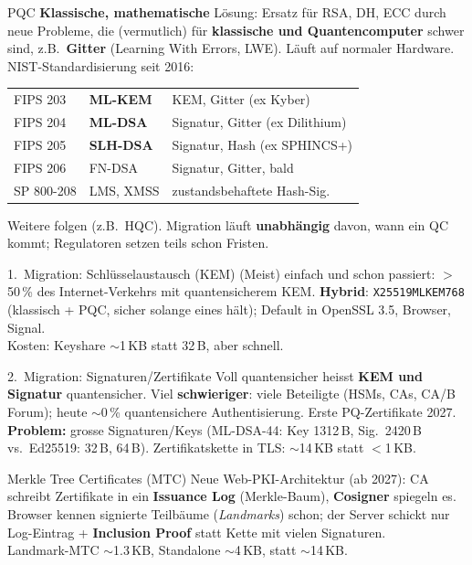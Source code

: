 \documentclass[a4paper, fontsize=7pt]{scrartcl}
\renewcommand*{\arraystretch}{1.5}  %
\begin{document}
\begin{mainbox}{PQC}
\textbf{Klassische, mathematische} Lösung: Ersatz für RSA, DH, ECC durch neue
Probleme, die (vermutlich) für \textbf{klassische und Quantencomputer} schwer sind,
z.B.\ \textbf{Gitter} (Learning With Errors, LWE). Läuft auf normaler Hardware.\\
NIST-Standardisierung seit 2016:
\renewcommand*{\arraystretch}{1.1}
\setlength{\tabcolsep}{3pt}
\begin{tabularx}{\linewidth}{@{}l|l|>{\raggedright\arraybackslash}X@{}}
FIPS 203 & \textbf{ML-KEM} & KEM, Gitter (ex Kyber) \\
FIPS 204 & \textbf{ML-DSA} & Signatur, Gitter (ex Dilithium) \\
FIPS 205 & \textbf{SLH-DSA} & Signatur, Hash (ex SPHINCS+) \\
FIPS 206 & FN-DSA & Signatur, Gitter, bald \\
SP 800-208 & LMS, XMSS & zustandsbehaftete Hash-Sig. \\
\end{tabularx}
Weitere folgen (z.B.\ HQC). Migration läuft \textbf{unabhängig} davon, wann ein QC
kommt; Regulatoren setzen teils schon Fristen.
\end{mainbox}

\begin{mainbox}{1.\ Migration: Schlüsselaustausch (KEM)}
(Meist) einfach und schon passiert: $>$50\,\% des Internet-Verkehrs mit
quantensicherem KEM. \textbf{Hybrid}: \texttt{X25519MLKEM768} (klassisch +
PQC, sicher solange eines hält); Default in OpenSSL 3.5, Browser, Signal.\\
Kosten: Keyshare $\sim$1\,KB statt 32\,B, aber schnell.
\end{mainbox}

\begin{mainbox}{2.\ Migration: Signaturen/Zertifikate}
Voll quantensicher heisst \textbf{KEM und Signatur} quantensicher. Viel
\textbf{schwieriger}: viele Beteiligte (HSMs, CAs, CA/B Forum); heute $\sim$0\,\%
quantensichere Authentisierung. Erste PQ-Zertifikate 2027.\\
\textbf{Problem:} grosse Signaturen/Keys (ML-DSA-44: Key 1312\,B, Sig.\ 2420\,B
vs.\ Ed25519: 32\,B, 64\,B). Zertifikatskette in TLS: $\sim$14\,KB statt
$<$1\,KB.
\end{mainbox}

\begin{subbox}{Merkle Tree Certificates (MTC)}
Neue Web-PKI-Architektur (ab 2027): CA schreibt Zertifikate in ein
\textbf{Issuance Log} (Merkle-Baum), \textbf{Cosigner} spiegeln es. Browser kennen
signierte Teilbäume (\emph{Landmarks}) schon; der Server schickt nur Log-Eintrag +
\textbf{Inclusion Proof} statt Kette mit vielen Signaturen.\\
Landmark-MTC $\sim$1.3\,KB, Standalone $\sim$4\,KB, statt $\sim$14\,KB.
\end{subbox}
\end{document}
